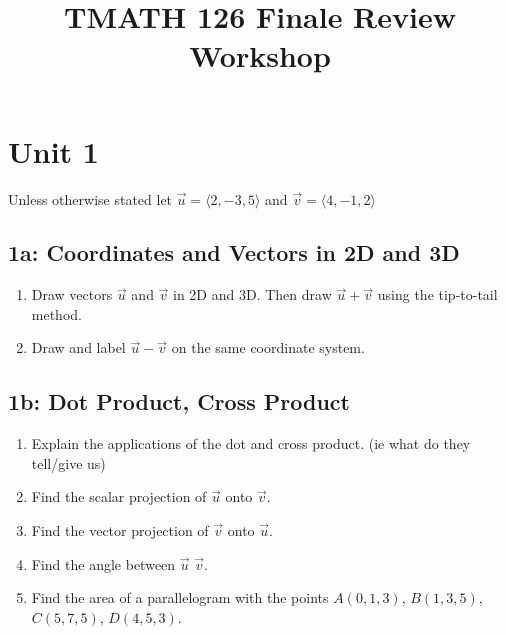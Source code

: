 \documentclass[11pt]{article}
\title{TMATH 126 Finale Review Workshop}
\author{}
\date{\vspace{-5ex}}
\newenvironment{exercise}{
    \begin{mdframed}[style=problemstyle]\textcolor{black}{}
}{
    \end{mdframed}
}
\begin{document}
\maketitle
\vspace{-5ex}%

\section*{Unit 1}
Unless otherwise stated let $\vec{u} = \langle 2,-3,5 \rangle$ and 
$\vec{v} = \langle 4, -1, 2 \rangle $ 
\subsection*{1a: Coordinates and Vectors in 2D and 3D}
\begin{exercise}
    \begin{enumerate}[label={\alph*}]
        \item Draw vectors $\vec{u}$ and $\vec{v}$ in 2D and 3D. 
            Then draw $\vec{u} + \vec{v}$ using the tip-to-tail method.
        \item Draw and label $\vec{u} - \vec{v}$ on the same coordinate 
            system.
    \end{enumerate}
\end{exercise}

\subsection*{1b: Dot Product, Cross Product}
\begin{exercise}
    \begin{enumerate}[label={\alph*}]
        \item Explain the applications of the dot and cross product.
            (ie what do they tell/give us)
        \item Find the scalar projection of $\vec{u}$ onto $\vec{v}$.
        \item Find the vector projection of $\vec{v}$ onto $\vec{u}$.
        \item Find the angle between $\vec{u}$ $\vec{v}$.
        \item Find the area of a parallelogram with the points $A(0,1,3)$, 
            $B(1,3,5)$, $C(5,7,5)$, $D(4,5,3)$.
    \end{enumerate}
\end{exercise}
\end{document}
